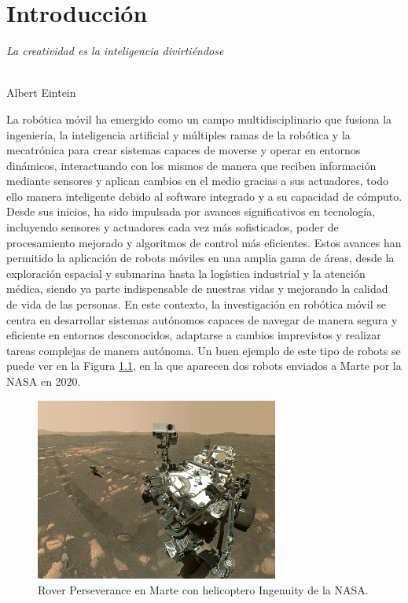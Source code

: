 \chapter{Introducción}
\label{cap:capitulo1}
\setcounter{page}{1}

\begin{flushright}
\begin{minipage}[]{10cm}
\emph{La creatividad es la inteligencia divirtiéndose}\\
\end{minipage}\\

Albert Eintein\\
\end{flushright}

\vspace{1cm}

La robótica móvil ha emergido como un campo multidisciplinario que fusiona la
ingeniería, la inteligencia artificial y múltiples ramas de la robótica y la
mecatrónica para crear sistemas capaces de moverse y operar en entornos
dinámicos, interactuando con los mismos de manera que reciben información
mediante sensores y aplican cambios en el medio gracias a sus actuadores, todo
ello manera inteligente debido al software integrado y a su capacidad de
cómputo.
Desde sus inicios, ha sido impulsada por avances significativos en tecnología,
incluyendo sensores y actuadores cada vez más sofisticados, poder de
procesamiento mejorado y algoritmos de control más eficientes.
Estos avances han permitido la aplicación de robots móviles en una amplia gama
de áreas, desde la exploración espacial y submarina hasta la logística
industrial y la atención médica, siendo ya parte indispensable de nuestras vidas
y mejorando la calidad de vida de las personas. En este contexto, la
investigación en robótica móvil se centra en desarrollar sistemas autónomos
capaces de navegar de manera segura y eficiente en entornos desconocidos,
adaptarse a cambios imprevistos y realizar tareas complejas de manera autónoma.
Un buen ejemplo de este tipo de robots se puede ver en la Figura
\ref{fig:rover}, en la que aparecen dos robots enviados a Marte por la NASA en
2020.

\begin{figure} [h!]
  \begin{center}
    \includegraphics[width=8cm]{figs/perseverance_and_ingenuity_mars_rover_selfie}
  \end{center}
  \caption{Rover Perseverance en Marte con helicoptero Ingenuity de la NASA.}
  \label{fig:rover}
\end{figure}\

